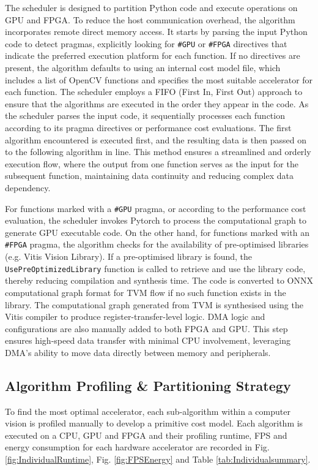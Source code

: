 \documentclass[]{spie}  %
\begin{document}
The scheduler is designed to partition Python code and execute operations on GPU and FPGA. To reduce the host communication overhead, the algorithm incorporates remote direct memory access\cite{xilinx_2019, nvidia_2024}. It starts by parsing the input Python code to detect pragmas, explicitly looking for \texttt{\#GPU} or \texttt{\#FPGA} directives that indicate the preferred execution platform for each function. If no directives are present, the algorithm defaults to using an internal cost model file, which includes a list of OpenCV functions and specifies the most suitable accelerator for each function. The scheduler employs a FIFO (First In, First Out) approach to ensure that the algorithms are executed in the order they appear in the code. As the scheduler parses the input code, it sequentially processes each function according to its pragma directives or performance cost evaluations. The first algorithm encountered is executed first, and the resulting data is then passed on to the following algorithm in line. This method ensures a streamlined and orderly execution flow, where the output from one function serves as the input for the subsequent function, maintaining data continuity and reducing complex data dependency.

For functions marked with a \texttt{\#GPU} pragma, or according to the performance cost evaluation, the scheduler invokes Pytorch to process the computational graph to generate GPU executable code.
On the other hand, for functions marked with an \texttt{\#FPGA} pragma, the algorithm checks for the availability of pre-optimised libraries (e.g. Vitis Vision Library). If a pre-optimised library is found, the \texttt{UsePreOptimizedLibrary} function is called to retrieve and use the library code, thereby reducing compilation and synthesis time. The code is converted to ONNX computational graph format for TVM flow if no such function exists in the library. The computational graph generated from TVM is synthesised using the Vitis compiler to produce register-transfer-level logic.
DMA logic and configurations are also manually added to both FPGA and GPU. This step ensures high-speed data transfer with minimal CPU involvement, leveraging DMA's ability to move data directly between memory and peripherals. 

\subsection{Algorithm Profiling \& Partitioning Strategy}
To find the most optimal accelerator, each sub-algorithm within a computer vision is profiled manually to develop a primitive cost model. Each algorithm is executed on a CPU, GPU and FPGA and their profiling runtime, FPS and energy consumption for each hardware accelerator are recorded in Fig. \ref{fig:IndividualRuntime}, Fig. \ref{fig:FPSEnergy} and Table \ref{tab:Individualsummary}. 
\end{document}
